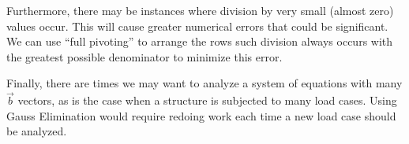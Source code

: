 \documentclass{../../KDHnotes}
\begin{document}
Furthermore, there may be instances where division by very small (almost zero) values occur. This will cause greater numerical errors that could be significant. We can use ``full pivoting'' to arrange the rows such division always occurs with the greatest possible denominator to minimize this error.

Finally, there are times we may want to analyze a system of equations with many $\vec{b}$ vectors, as is the case when a structure is subjected to many load cases. Using Gauss Elimination would require redoing work each time a new load case should be analyzed.

\nocite{3Brown1Blue-taylorseries}

\newpage



\end{document}
